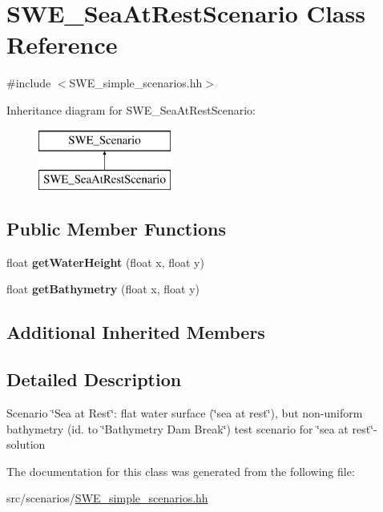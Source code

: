 \hypertarget{classSWE__SeaAtRestScenario}{\section{S\-W\-E\-\_\-\-Sea\-At\-Rest\-Scenario Class Reference}
\label{classSWE__SeaAtRestScenario}
}


{\ttfamily \#include $<$S\-W\-E\-\_\-simple\-\_\-scenarios.\-hh$>$}

Inheritance diagram for S\-W\-E\-\_\-\-Sea\-At\-Rest\-Scenario\-:\begin{figure}[H]
\begin{center}
\leavevmode
\includegraphics[height=2.000000cm]{classSWE__SeaAtRestScenario}
\end{center}
\end{figure}
\subsection*{Public Member Functions}
\begin{DoxyCompactItemize}
\item 
\hypertarget{classSWE__SeaAtRestScenario_a0d493a2c96cde62cc71035c5f62717d1}{float {\bfseries get\-Water\-Height} (float x, float y)}\label{classSWE__SeaAtRestScenario_a0d493a2c96cde62cc71035c5f62717d1}

\item 
\hypertarget{classSWE__SeaAtRestScenario_a738776f758bb5b914ede2e6f57cb3ffd}{float {\bfseries get\-Bathymetry} (float x, float y)}\label{classSWE__SeaAtRestScenario_a738776f758bb5b914ede2e6f57cb3ffd}

\end{DoxyCompactItemize}
\subsection*{Additional Inherited Members}


\subsection{Detailed Description}
Scenario \char`\"{}\-Sea at Rest\char`\"{}\-: flat water surface (\char`\"{}sea at rest\char`\"{}), but non-\/uniform bathymetry (id. to \char`\"{}\-Bathymetry Dam Break\char`\"{}) test scenario for \char`\"{}sea at rest\char`\"{}-\/solution 

The documentation for this class was generated from the following file\-:\begin{DoxyCompactItemize}
\item 
src/scenarios/\hyperlink{SWE__simple__scenarios_8hh}{S\-W\-E\-\_\-simple\-\_\-scenarios.\-hh}\end{DoxyCompactItemize}
